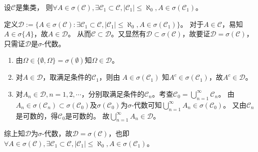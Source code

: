 \documentclass{ctexart}
\begin{document}
\begin{problem}\label{pro:1.4.3}
  设\(\mathcal{C} \)是集类，
  则\(\forall A \in \sigma(\mathcal{C}),\exists \mathcal{C}_1 \subset \mathcal{C},|\mathcal{C}_1| \leq \aleph_0,A \in \sigma(\mathcal{C}_1) \)。
\end{problem}
\begin{solution}
  定义\(\mathcal{D}:=\{ A \in \sigma(\mathcal{C}):\exists \mathcal{C}_1 \subset \mathcal{C},|\mathcal{C}_1| \leq \aleph_0,A \in \sigma(\mathcal{C}_1) \} \)。
  对于\(A \in \mathcal{C} \)，易知\(A \in \sigma\{A\} \)，故\(A \in \mathcal{D} \)。
  从而\(\mathcal{C} \subset \mathcal{D} \)。又显然有\(\mathcal{D} \subset \sigma(\mathcal{C}) \)，故要证\(\mathcal{D} =\sigma(\mathcal{C})\)，只需证\(\mathcal{D} \)是\(\sigma \)-代数。

  \begin{enumerate}
    \item 由\(\Omega \in \{\emptyset,\Omega\} = \sigma(\emptyset) \)知\(\Omega \in \mathcal{D} \)。
    \item 对\(A \in \mathcal{D} \)，取满足条件的\(\mathcal{C}_1 \)，则由 \(A \in \sigma(\mathcal{C}_1) \) 知\(A^c \in \sigma(\mathcal{C}_1) \)，故\(A^c \in \mathcal{D} \)。
    \item 对\(A_n \in \mathcal{D},n=1,2,\cdots \)，分别取满足条件的\(\mathcal{C}_n \)。考查\(\mathcal{C}_0=\bigcup_{n=1}^{\infty} \mathcal{C}_n \)。
      由\(A_n \in \sigma(\mathcal{C}_n) \subset \sigma(\mathcal{C}_0) \)及\(\sigma(\mathcal{C}_0) \)为\(\sigma \)-代数可知\(\bigcup_{n=1}^{\infty} A_n \in \sigma(\mathcal{C}_0) \)。
      又由\(\mathcal{C}_n \)是可数的，得\(\mathcal{C}_0 \)是可数的。
      故\(\bigcup_{n=1}^{\infty} A_n \in \mathcal{D} \)。
  \end{enumerate}
  综上知\(\mathcal{D} \)为\(\sigma \)-代数，故\(\mathcal{D}=\sigma(\mathcal{C}) \)，也即\(\forall A \in \sigma(\mathcal{C}),\exists \mathcal{C}_1 \subset \mathcal{C},|\mathcal{C}_1| \leq \aleph_0,A \in \sigma(\mathcal{C}_1) \)。
\end{solution}
\end{document}
